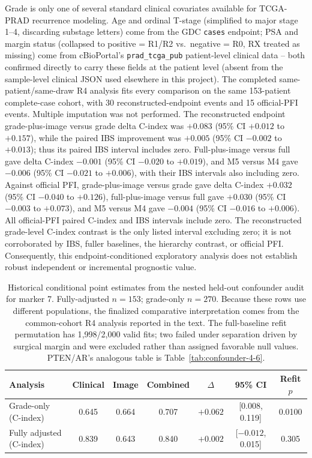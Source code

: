 Grade is only one of several standard clinical covariates available for TCGA-PRAD recurrence
modeling. Age and ordinal T-stage (simplified to major stage 1--4, discarding substage letters)
come from the GDC \texttt{cases} endpoint; PSA and margin status (collapsed to positive =
R1/R2 vs.\ negative = R0, RX treated as missing) come from cBioPortal's
\texttt{prad\_tcga\_pub} patient-level clinical data -- both confirmed directly to carry these
fields at the patient level (absent from the sample-level clinical JSON used elsewhere in this
project). The completed same-patient/same-draw R4 analysis fits every comparison on the same
153-patient complete-case cohort, with 30 reconstructed-endpoint events and 15 official-PFI
events. Multiple imputation was not performed. The reconstructed endpoint grade-plus-image
versus grade delta C-index was $+0.083$ (95\% CI $+0.012$ to $+0.157$), while
the paired IBS improvement was $+0.005$ (95\% CI $-0.002$ to $+0.013$); thus its paired IBS
interval includes zero. Full-plus-image versus full gave delta C-index $-0.001$ (95\% CI
$-0.020$ to $+0.019$), and M5 versus M4 gave $-0.006$ (95\% CI $-0.021$ to $+0.006$), with
their IBS intervals also including zero. Against official PFI, grade-plus-image versus grade
gave delta C-index $+0.032$ (95\% CI $-0.040$ to $+0.126$), full-plus-image versus full gave
$+0.030$ (95\% CI $-0.003$ to $+0.073$), and M5 versus M4 gave $-0.004$ (95\% CI $-0.016$ to
$+0.006$). All official-PFI paired C-index and IBS intervals include zero. The reconstructed
grade-level C-index contrast is the only listed interval excluding zero; it is not corroborated
by IBS, fuller baselines, the hierarchy contrast, or official PFI. Consequently, this
endpoint-conditioned exploratory analysis does not establish robust independent or incremental
prognostic value.

\begin{table}[htbp]
\centering
\small
\begin{tabular}{lcccccc}
\toprule
Analysis & Clinical & Image & Combined & $\Delta$ & 95\% CI & Refit $p$ \\
\midrule
Grade-only (C-index) & 0.645 & 0.664 & 0.707 & $+0.062$ & [0.008, 0.119] & 0.0100 \\
Fully adjusted (C-index) & 0.839 & 0.643 & 0.840 & $+0.002$ & [$-0.012$, 0.015] & 0.305 \\
\bottomrule
\end{tabular}
\caption{Historical conditional point estimates from the nested held-out confounder audit for
marker 7. Fully-adjusted $n=153$; grade-only $n=270$. Because these rows use different
populations, the finalized comparative interpretation comes from the common-cohort R4 analysis
reported in the text. The full-baseline
refit permutation has 1{,}998/2{,}000 valid fits; two failed under
separation driven by surgical margin and were excluded rather than assigned favorable null
values. PTEN/AR's analogous table is Table~\ref{tab:confounder-4-6}.}
\label{tab:confounder-7}
\end{table}

